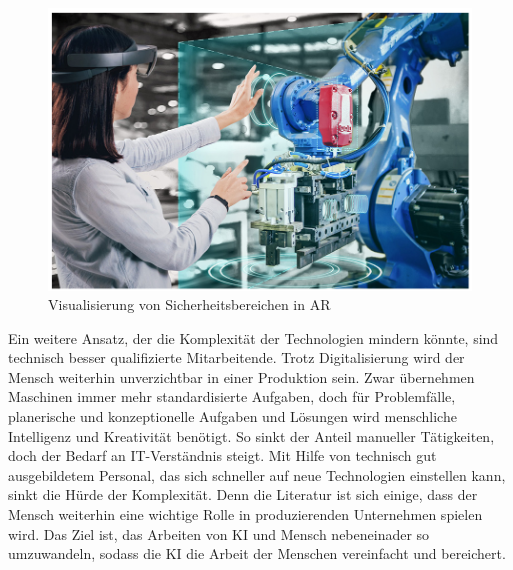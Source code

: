 \documentclass[a4paper,12pt, german]{report}
\begin{document}
\begin{figure}[H]
  \center
 \includegraphics[width=12cm]{images/bild.png}
  \caption[Visualisierung von Sicherheitsbereichen in AR]{Visualisierung von Sicherheitsbereichen in AR \cite{42}}
\end{figure}

Ein weitere Ansatz, der die Komplexität der Technologien mindern könnte, sind technisch besser qualifizierte Mitarbeitende. Trotz Digitalisierung wird der Mensch weiterhin unverzichtbar in einer Produktion sein. Zwar übernehmen Maschinen immer mehr standardisierte Aufgaben, doch für Problemfälle, planerische und konzeptionelle Aufgaben und Lösungen wird menschliche Intelligenz und Kreativität benötigt. So sinkt der Anteil manueller Tätigkeiten, doch der Bedarf an IT-Verständnis steigt.\cite{36} Mit Hilfe von technisch gut ausgebildetem Personal, das sich schneller auf neue Technologien einstellen kann, sinkt die Hürde der Komplexität. Denn die Literatur ist sich einige, dass der Mensch weiterhin eine wichtige Rolle in produzierenden Unternehmen spielen wird. Das Ziel ist, das Arbeiten von KI und Mensch nebeneinader so umzuwandeln, sodass die KI die Arbeit der Menschen vereinfacht und bereichert.\cite{02}
\end{document}
